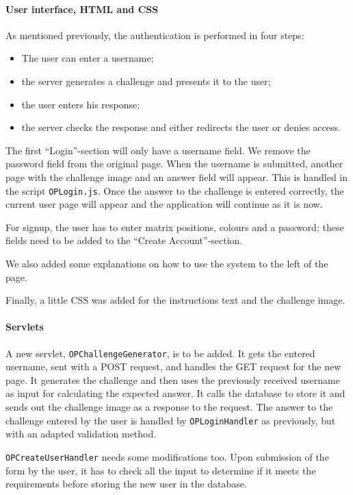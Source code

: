 \documentclass[11pt,a4paper]{article}
\begin{document}
\paragraph{User interface, HTML and CSS}
As mentioned previously, the authentication is performed in four steps:
\begin{itemize}
\item The user can enter a username;
\item the server generates a challenge and presents it to the user;
\item the user enters his response;
\item the server checks the response and either redirects the user or denies access.
\end{itemize}
The first ``Login''-section will only have a username field. We remove the password field from the original page.  When the username is submitted, another page with the challenge image and an answer field will appear. This is handled in the script \texttt{OPLogin.js}. Once the answer to the challenge is entered correctly, the current user page will appear and the application will continue as it is now.

For signup, the user has to enter matrix positions, colours and a password; these fields need to be added to the ``Create Account''-section.

We also added some explanations on how to use the system to the left of the page.

Finally, a little CSS was added for the instructions text and the challenge image.

\paragraph{Servlets}
A new servlet, \texttt{OPChallengeGenerator}, is to be added. It gets the entered username, sent with a POST request, and handles the GET request for the new page. It generates the challenge and then uses the previously received username as input for calculating the expected answer. It calls the database to store it and sends out the challenge image as a response to the request.
The answer to the challenge entered by the user is handled by \texttt{OPLoginHandler} as previously, but with an adapted validation method.

\texttt{OPCreateUserHandler} needs some modifications too. Upon submission of the form by the user, it has to check all the input to determine if it meets the requirements before storing the new user in the database.
\end{document}
